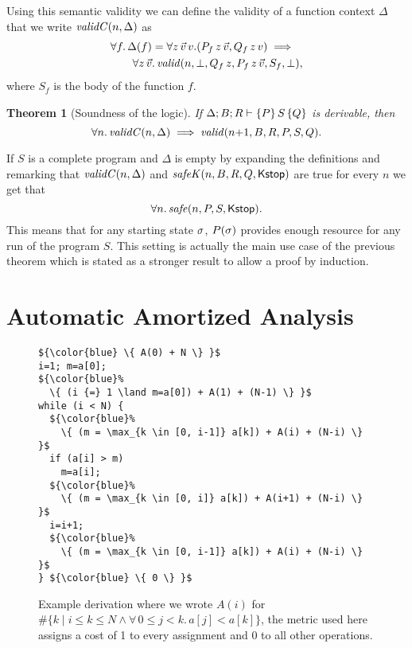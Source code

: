 \documentclass[nocopyrightspace,preprint]{sigplanconf}
\newtheorem{theorem}{Theorem}
\begin{document}
Using this semantic validity  we can define the validity of
a function context $\Delta$ that we write $\mathit{validC}(n,\Delta)$ as
\begin{align*}
  &\forall f .\, \Delta(f) =
    \forall z \, \vec v \, v .(P_f \, z \, \vec v, Q_f \, z \, v)
    \implies \\
  &\qquad \forall z \, \vec v .\,
  \mathit{valid}(n,\bot,Q_f \, z,P_f \, z \, \vec v,S_f,\bot) ,
\end{align*}
where $S_f$ is the body of the function $f$.
%
\begin{theorem}[Soundness of the logic]
  If $\Delta; B; R \vdash \{P\}\, S\, \{Q\}$ is derivable, then
  $$
    \forall n .\, \mathit{validC}(n,\Delta)
      \implies \mathit{valid}(n {+} 1,B,R,P,S,Q).
  $$
\end{theorem}
%
\noindent
If $S$ is a complete program and $\Delta$ is empty by
expanding the definitions and remarking that $\mathit{validC}(n,\Delta)$
and $\mathit{safeK}(n,B,R,Q,\mathsf{Kstop})$ are true for every $n$ we get that 
$$
  \forall n .\, \mathit{safe}(n,P,S,\mathsf{Kstop}).
$$
This means that for any starting state $\sigma$, $P(\sigma)$
provides enough resource for any run of the program $S$.  This
setting is actually the main use case of the previous theorem
which is stated as a stronger result to allow a proof by
induction.

\section{Automatic Amortized Analysis}

\begin{figure}
\begin{lstlisting}
${\color{blue} \{ A(0) + N \} }$
i=1; m=a[0];
${\color{blue}%
  \{ (i {=} 1 \land m=a[0]) + A(1) + (N-1) \} }$
while (i < N) {
  ${\color{blue}%
    \{ (m = \max_{k \in [0, i-1]} a[k]) + A(i) + (N-i) \} }$
  if (a[i] > m)
    m=a[i];
  ${\color{blue}%
    \{ (m = \max_{k \in [0, i]} a[k]) + A(i+1) + (N-i) \} }$
  i=i+1;
  ${\color{blue}%
    \{ (m = \max_{k \in [0, i-1]} a[k]) + A(i) + (N-i) \} }$
} ${\color{blue} \{ 0 \} }$
\end{lstlisting}
\caption{Example derivation where we wrote $A(i)$
  for $\#\{ k \mid i \le k \le N \land \forall\, 0\le j<k.\, a[j] < a[k]\}$,
  the metric used here assigns a cost of 1 to every assignment
  and 0 to all other operations.
  }
\label{fig:xmplmax}
\end{figure}
\end{document}
